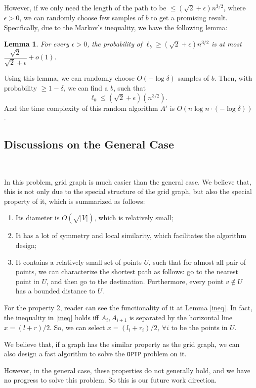 \documentclass[11pt]{article}
\theoremstyle{plain}
\newtheorem{lemma}{Lemma}[section]
\begin{document}
However, if we only need the length of the path to be $\le (\sqrt{2}+\epsilon)n^{3/2}$, where $\epsilon>0$, we can randomly choose few samples of $b$ to get a promising result. Specifically, due to the Markov's inequality, we have the following lemma:
\begin{lemma}
    \label{lemma5.4}
For every $\epsilon>0$, the probability of $\ell_b\ge (\sqrt{2}+\epsilon)n^{3/2}$ is at most $\dfrac{\sqrt{2}}{\sqrt{2}+\epsilon}+o(1)$.
\end{lemma}
Using this lemma, we can randomly choose $O(-\log \delta)$ samples of $b$. Then, with probability $\ge 1-\delta$, we can find a $b$, such that
$$\ell_b\le (\sqrt{2}+\epsilon)(n^{3/2}).$$
And the time complexity of this random algorithm $A'$ is $O(n\log n\cdot (-\log \delta))$.

\subsection{Discussions on the General Case}\

In this problem, grid graph is much easier than the general case. We believe that, this is not only due to the special structure of the grid graph, but also the special property of it, which is summarized as follows:
\begin{enumerate}
    \item Its diameter is $O(\sqrt{|V|})$, which is relatively small;
    \item It has a lot of symmetry and local similarity, which facilitates the algorithm design;
    \item It contains a relatively small set of points $U$, such that for almost all pair of points, we can characterize the shortest path as follows: go to the nearest point in $U$, and then go to the destination. Furthermore, every point $v\not\in U$ has a bounded distance to $U$.
\end{enumerate}

For the property 2, reader can see the functionality of it at Lemma \ref{ineq}. In fact, the inequality in \ref{ineq} holds iff $A_i,A_{i+1}$ is separated by the horizontal line $x=(l+r)/2$. So, we can select $x=(l_i+r_i)/2,\ \forall i$ to be the points in $U$.

We believe that, if a graph has the similar property as the grid graph, we can also design a fast algorithm to solve the \texttt{OPTP} problem on it.

However, in the general case, these properties do not generally hold, and we have no progress to solve this problem. So this is our future work direction.

\end{document}
